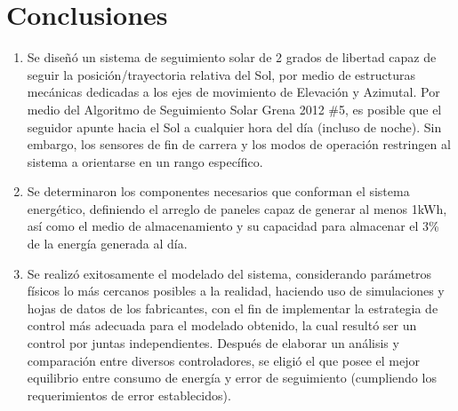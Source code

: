 \setcounter{secnumdepth}{-1}
\chapter{Conclusiones}
\begin{enumerate}
    \item Se diseñó un sistema de seguimiento solar de 2 grados de libertad capaz de seguir la posición/trayectoria relativa del Sol, por medio de estructuras mecánicas dedicadas a los ejes de movimiento de Elevación y Azimutal. Por medio del Algoritmo de Seguimiento Solar Grena 2012 \#5, es posible que el seguidor apunte hacia el Sol a cualquier hora del día (incluso de noche). Sin embargo, los sensores de fin de carrera y los modos de operación restringen al sistema a orientarse en un rango específico.
    \item Se determinaron los componentes necesarios que conforman el sistema energético, definiendo el arreglo de paneles capaz de generar al menos 1kWh, así como el medio de almacenamiento y su capacidad para almacenar el 3\% de la energía generada al día.
    \item Se realizó exitosamente el modelado del sistema, considerando parámetros físicos lo más cercanos posibles a la realidad, haciendo uso de simulaciones y hojas de datos de los fabricantes, con el fin de implementar la estrategia de control más adecuada para el modelado obtenido, la cual resultó ser un control por juntas independientes.
    Después de elaborar un análisis y comparación entre diversos controladores, se eligió el que posee el mejor equilibrio entre consumo de energía y error de seguimiento (cumpliendo los requerimientos de error establecidos).

\end{enumerate}
